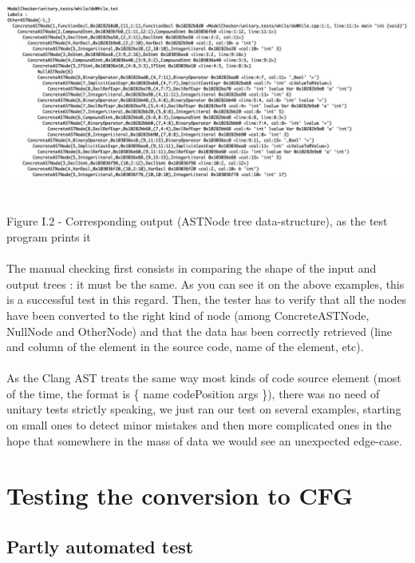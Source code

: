 \documentclass{report}
\begin{document}
\begin{center}
\includegraphics[scale=0.3]{data/while_astNode.jpg}
~\\~\\Figure I.2 - Corresponding output (ASTNode tree data-structure), as the test program prints it
\end{center}

\paragraph{}
\hspace{4mm}The manual checking first consists in comparing the shape of the input and output trees : it must be the same. As you can see it on the above examples,
this is a successful test in this regard. Then, the tester has to verify that all the nodes have been converted to the right kind of node (among ConcreteASTNode,
NullNode and OtherNode) and that the data has been correctly retrieved (line and column of the element in the source code, name of the element, etc).

\paragraph{}
\hspace{4mm}As the Clang AST treats the same way most kinds of code source element (most of the time, the format is \{ name codePosition args \}), there was no need of unitary tests
strictly speaking, we just ran our test on several examples, starting on small ones to detect minor mistakes and then more complicated ones in the hope that somewhere
in the mass of data we would see an unexpected edge-case.

\section{Testing the conversion to CFG}

\subsection{Partly automated test}
\end{document}
